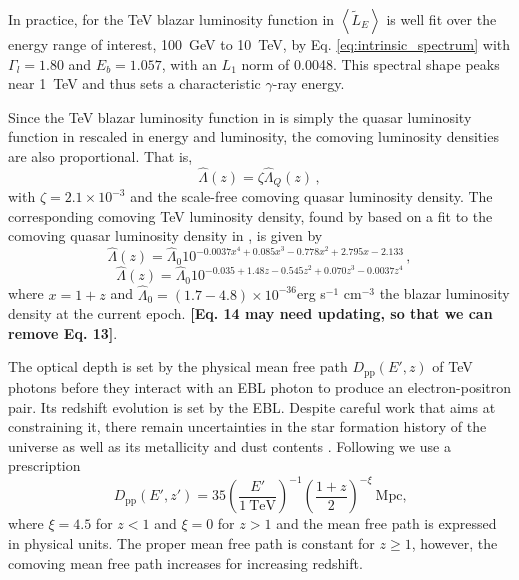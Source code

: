 \documentclass[numberedappendix]{emulateapj}
\newcommand\ALc[1]{{\color{red} \bf #1}} %
\begin{document}
In practice, for the TeV blazar luminosity function in
\citet{2014ApJ...790..137B} $\left< \tilde{L}_E \right>$ is well fit
over the energy range of interest, 100~GeV to 10~TeV, by
Eq. \ref{eq:intrinsic_spectrum} with $\Gamma_l=1.80$ and $E_b=1.057$,
with an $L_1$ norm of 0.0048.  This spectral shape peaks near 1~TeV
and thus sets a characteristic $\gamma$-ray energy.

Since the TeV blazar luminosity function in
\citet{2014ApJ...790..137B} is simply the quasar luminosity function
in \citet{2007ApJ...654..731H} rescaled in energy and luminosity, the
comoving luminosity densities are also proportional.  That is,
\begin{equation}
\hat{\Lambda}(z) = \zeta \hat{\Lambda}_Q(z)\,,
\end{equation}
with $\zeta=2.1\times 10^{-3}$ and the scale-free comoving quasar
luminosity density.  The corresponding comoving TeV luminosity
density, found by \citet{2012ApJ...752...23C} based on a fit to the
comoving quasar luminosity density in \citet{2007ApJ...654..731H}, is
given by
\begin{equation}
\label{eq:phi_quasar}
\hat{\Lambda}(z)=\hat{\Lambda}_0 10^{-0.0037x^4+0.085x^3-0.778x^2+2.795x-2.133}\,,
\end{equation}
\begin{equation}
\label{eq:phi_quasar}
\hat{\Lambda}(z)=\hat{\Lambda}_0 10^{-0.035+1.48z-0.545z^2+0.070z^3-0.0037z^4}
\end{equation}
where $x=1+z$ and
$\hat{\Lambda}_0=(1.7-4.8)\times 10^{-36}$erg s$^{-1}$ cm$^{-3}$ the
blazar luminosity density at the current epoch. 
\ALc{[{Eq. 14 may need updating, so that we can remove Eq. 13}]}.



The optical depth is set by the physical mean free path $D_\mathrm{pp}(E',z)$ of TeV photons before they interact with an EBL photon to produce an electron-positron pair. Its redshift evolution is set by the EBL. Despite careful work that aims at constraining it, there remain uncertainties in the star formation history of the universe as well as its metallicity and dust contents \citep[see, e.g.][]{2008A&A...487..837F,2006ApJ...648..774S}. Following \citet{2012ApJ...752...23C} we use a prescription
\begin{equation}
\label{eq:mean_free_path}
D_{\mathrm{pp}}(E',z')=35\left(\frac{E'}{1~\textrm{TeV}}\right)^{-1} \left(\frac{1+z}{2}\right)^{-\xi}~\textrm{Mpc,}
\end{equation}
where $\xi=4.5$ for $z<1$ and $\xi=0$ for $z>1$ \citep{2004A&A...413..807K,2009PhRvD..80l3012N} and the mean free path is expressed in physical units. The proper mean free path is constant for $z\geq 1$, however, the comoving mean free path increases for increasing redshift.
\end{document}

